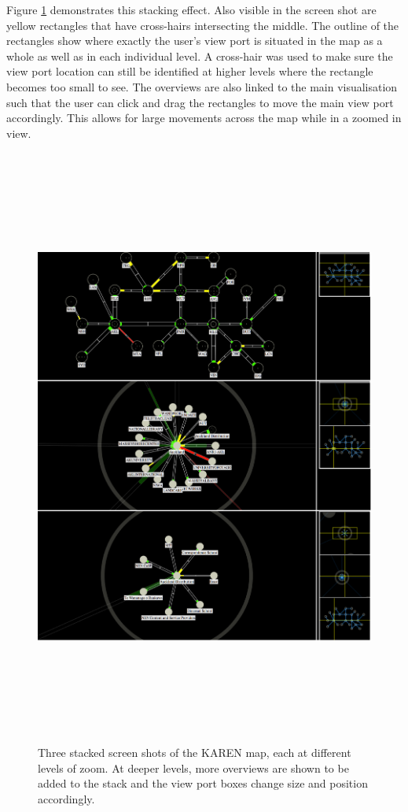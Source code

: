 \documentclass[11pt, a4paper]{article}
\begin{document}
Figure \ref{fig:overviews1.0} demonstrates this stacking effect. Also visible in
the screen shot are yellow rectangles that have cross-hairs intersecting the
middle. The outline of the rectangles show where exactly the user's view port is
situated in the map as a whole as well as in each individual level. A cross-hair
was used to make sure the view port location can still be identified at higher
levels where the rectangle becomes too small to see. The overviews are also
linked to the main visualisation such that the user can click and drag the
rectangles to move the main view port accordingly. This allows for large
movements across the map while in a zoomed in view.

\begin{figure}
\centering
\includegraphics[width=170mm,height=197.95mm]{assets/overviews1-0.eps}
\caption{Three stacked screen shots of the KAREN map, each at different levels
of zoom. At deeper levels, more overviews are shown to be added to the stack
and the view port boxes change size and position accordingly.}
\label{fig:overviews1.0}
\end{figure}
\end{document}
